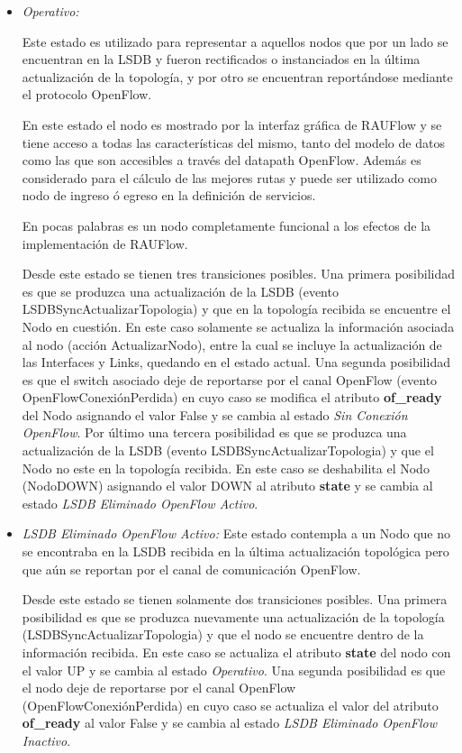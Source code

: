 \begin{itemize}
\item \textit{Operativo:}

Este estado es utilizado para representar a aquellos nodos que por un lado se encuentran en la LSDB y fueron rectificados o instanciados en la \'ultima actualizaci\'on de la topolog\'ia, y por otro se encuentran report\'andose mediante el protocolo OpenFlow.

En este estado el nodo es mostrado por la interfaz gr\'afica de RAUFlow y se tiene acceso a todas las características del mismo, tanto del modelo de datos como las que son accesibles a trav\'es del datapath OpenFlow. Adem\'as es considerado para el c\'alculo de las mejores rutas y puede ser utilizado como nodo de ingreso \'o egreso en la definici\'on de servicios.

En pocas palabras es un nodo completamente funcional a los efectos de la implementaci\'on de RAUFlow.

Desde este estado se tienen tres transiciones posibles. Una primera posibilidad es que se produzca una actualización de la LSDB (evento LSDBSyncActualizarTopologia) y que en la topolog\'ia recibida se encuentre el Nodo en cuesti\'on. En este caso solamente se actualiza la informaci\'on asociada al nodo (acción ActualizarNodo), entre la cual se incluye la actualización de las Interfaces y Links, quedando en el estado actual. Una segunda posibilidad es que el switch asociado deje de reportarse por el canal OpenFlow (evento OpenFlowConexiónPerdida) en cuyo caso se modifica el atributo \textbf{of\_ready} del Nodo asignando el valor False y se cambia al estado \textit{Sin Conexión OpenFlow}. Por \'ultimo una tercera posibilidad es que se produzca una actualizaci\'on de la LSDB (evento LSDBSyncActualizarTopologia) y que el Nodo no este en la topolog\'ia recibida. En este caso se deshabilita el Nodo (NodoDOWN) asignando el valor DOWN al atributo \textbf{state} y se cambia al estado \textit{LSDB Eliminado OpenFlow Activo}.

\item \textit{LSDB Eliminado OpenFlow Activo:} Este estado contempla a un Nodo que no se encontraba en la LSDB recibida en la \'ultima actualizaci\'on topol\'ogica pero que a\'un se reportan por el canal de comunicaci\'on OpenFlow.

Desde este estado se tienen solamente dos transiciones posibles. Una primera posibilidad es que se produzca nuevamente una actualización de la topolog\'ia 
 (LSDBSyncActualizarTopologia) y que el nodo se encuentre dentro de la información recibida. En este caso se actualiza el atributo \textbf{state} del nodo con el valor UP y se cambia al estado \textit{Operativo}. Una segunda posibilidad es que el nodo deje de reportarse por el canal OpenFlow (OpenFlowConexiónPerdida) en cuyo caso se actualiza el valor del atributo \textbf{of\_ready} al valor False y se cambia al estado \textit{LSDB Eliminado OpenFlow Inactivo}.


\end{itemize}
